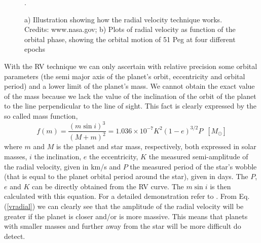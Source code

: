 \documentclass[dvips,12pt,a4paper]{report}
\begin{document}
\begin{figure}[h]
\centering
{}
\caption[The RV Technique illustration and plots]{a) Illustration showing how the radial velocity technique works. Credits: www.nasa.gov; b) Plots of radial velocity as function of the orbital phase, showing the orbital motion of 51 Peg at four different epochs \citep{Mayor-1995}}.
\label{rvpic}
\end{figure}

With the RV technique we can only ascertain with relative precision some orbital parameters (the semi major axis of the planet's orbit, eccentricity and orbital period) and a lower limit of the planet's mass. We cannot obtain the exact value of the mass because we lack the value of the inclination of the orbit of the planet to the line perpendicular to the line of sight. This fact is clearly expressed by the so called mass function,
\begin{equation}
 f(m)=\frac{(m \sin i)^3}{(M+m)^2}=1.036\times10^{-7}K^2(1-e)^{3/2}P\,\,\, [M_\odot]
\label {vradial}
\end{equation}
where $m$ and $M$ is the planet and star mass, respectively, both expressed in solar masses, $i$ the inclination, $e$ the eccentricity, $K$ the measured semi-amplitude of the radial velocity, given in km/s and $P$ the measured period of the star's wobble (that is equal to the planet orbital period around the star), given in days. The $P$, $e$ and $K$ can be directly obtained from the RV curve. The $m \sin i$ is then calculated with this equation. For a detailed demonstration refer to \citet{Santos-2008}. From Eq. (\ref{vradial}) we can clearly see that the amplitude of the radial velocity will be greater if the planet is closer and/or is more massive. This means that planets with smaller masses and further away from the star will be more difficult do detect. 
\end{document}
